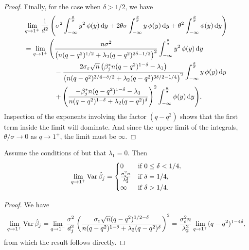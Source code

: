 \begin{proof}
  Finally, for the case when \(\delta > 1/2\), we have
  \begin{multline*}
    \lim_{q \rightarrow 1^+} \frac{1}{d^2} \left(\sigma^2 \int_{-\infty}^\frac{\theta}{\sigma} y^2 \operatorname{\phi}(y) \mathop{}\!\mathrm{d} y + 2 \theta \sigma \int_{-\infty}^\frac{\theta}{\sigma} y \operatorname{\phi}(y) \mathop{}\!\mathrm{d} y + \theta^2 \int_{-\infty}^\frac{\theta}{\sigma} \operatorname{\phi}(y) \mathop{}\!\mathrm{d} y\right) \\
    \begin{aligned}
      = \lim_{q \rightarrow 1^+} \Bigg( & \frac{n \sigma^2}{ \left(n (q-q^2)^{1/2} + \lambda_2(q-q^2)^{2\delta - 1/2}\right)^2} \int_{-\infty}^\frac{\theta}{\sigma} y^2 \operatorname{\phi}(y) \mathop{}\!\mathrm{d} y                                                                                          \\
                                        & - \frac{2\sigma_\varepsilon \sqrt{n}\left(\beta_j^* n (q- q^2)^{1 - \delta} - \lambda_1\right)}{\left(n(q-q^2)^{3/4 - \delta/2} + \lambda_2(q-q^2)^{3\delta / 2 - 1/4}\right)^2} \int_{-\infty}^\frac{\theta}{\sigma} y \operatorname{\phi}(y) \mathop{}\!\mathrm{d} y \\
                                        & + \left(\frac{-\beta_j^*n(q-q^2)^{1-\delta} - \lambda_1}{n(q-q^2)^{1-\delta} + \lambda_2(q-q^2)^\delta}\right)^2 \int_{-\infty}^\frac{\theta}{\sigma} \operatorname{\phi}(y) \mathop{}\!\mathrm{d} y\Bigg).
    \end{aligned}
  \end{multline*}
  Inspection of the exponents involving the factor \((q - q^2)\) shows that the first term inside the limit will dominate. And since the upper limit of the integrals, \(\theta/\sigma \rightarrow  0\)  as \(q \rightarrow 1^+\), the limit must be \(\infty\).

\end{proof}

\begin{corollary}
  Assume the conditions of  but that \(\lambda_1 = 0\). Then
  \[
    \lim_{q \rightarrow 1^+} \operatorname{Var} \hat{\beta}_j =
    \begin{cases}
      0                                          & \text{if } 0 \leq \delta < 1/4, \\
      \frac{\sigma_\varepsilon^2 n}{\lambda_2^2} & \text{if } \delta = 1/4,        \\
      \infty                                     & \text{if } \delta > 1/4.
    \end{cases}
  \]
\end{corollary}
\begin{proof}
  We have
  \begin{equation*}
    \lim_{q\rightarrow 1^+}\operatorname{Var} \hat{\beta}_j = \lim_{q \rightarrow 1^+}\frac{\sigma^2}{d_j^2} \left(\frac{\sigma_\varepsilon \sqrt{n} (q - q^2)^{1/2 - \delta}}{n (q-q^2)^{1 - \delta} + \lambda_2 (q-q^2)^\delta}\right)^2
    = \frac{\sigma_\varepsilon^2 n}{\lambda_2^2} \lim_{q \rightarrow 1^+}(q-q^2)^{1 - 4\delta},
  \end{equation*}
  from which the result follows directly.
\end{proof}

